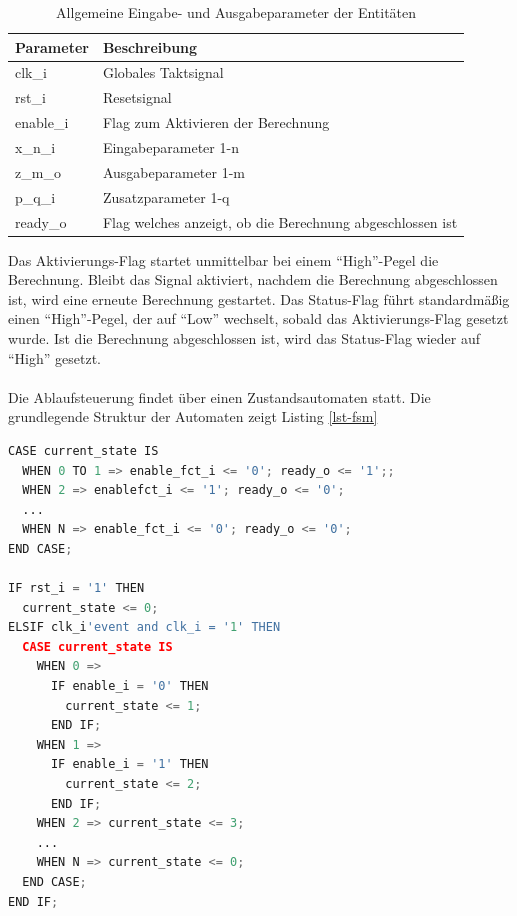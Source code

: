 \begin{table} [h]
	\centering 
	\begin{tabular}{ | p{3cm} | p{12cm} | }
		\hline
		\textbf{Parameter} & \textbf{Beschreibung}\\
		\hline
		clk\_i & Globales Taktsignal \\
		\hline
		rst\_i & Resetsignal \\
		\hline
		enable\_i & Flag zum Aktivieren der Berechnung \\
		\hline
		x\_n\_i & Eingabeparameter 1-n \\
		\hline
		z\_m\_o & Ausgabeparameter 1-m \\
		\hline
		p\_q\_i & Zusatzparameter 1-q \\
		\hline
		ready\_o & Flag welches anzeigt, ob die Berechnung abgeschlossen ist \\
		\hline
	\end{tabular}
	\caption{Allgemeine Eingabe- und Ausgabeparameter der Entitäten}
	\label{tab:vhdl-impl-ecdsa-general}
\end{table}

Das Aktivierungs-Flag startet unmittelbar bei einem ``High''-Pegel die Berechnung. Bleibt das Signal aktiviert, nachdem die Berechnung abgeschlossen ist, wird eine erneute Berechnung gestartet. Das Status-Flag führt standardmäßig einen ``High''-Pegel, der auf ``Low'' wechselt, sobald das Aktivierungs-Flag gesetzt wurde. Ist die Berechnung abgeschlossen ist, wird das Status-Flag wieder auf ``High'' gesetzt.
\\ \\
Die Ablaufsteuerung findet über einen Zustandsautomaten statt. Die grundlegende Struktur der Automaten zeigt Listing \ref{lst-fsm}\\ 

\begin{lstlisting}[language=Python,frame=single,label=lst-fsm,caption=Grundstruktur der Zustandsautomaten]
CASE current_state IS
  WHEN 0 TO 1 => enable_fct_i <= '0'; ready_o <= '1';;
  WHEN 2 => enablefct_i <= '1'; ready_o <= '0';
  ...
  WHEN N => enable_fct_i <= '0'; ready_o <= '0';
END CASE;

IF rst_i = '1' THEN
  current_state <= 0;
ELSIF clk_i'event and clk_i = '1' THEN
  CASE current_state IS
    WHEN 0 => 
      IF enable_i = '0' THEN 
        current_state <= 1; 
      END IF;
    WHEN 1 => 
      IF enable_i = '1' THEN 
        current_state <= 2; 
      END IF;
    WHEN 2 => current_state <= 3;
    ...
    WHEN N => current_state <= 0; 
  END CASE;
END IF;
\end{lstlisting}

